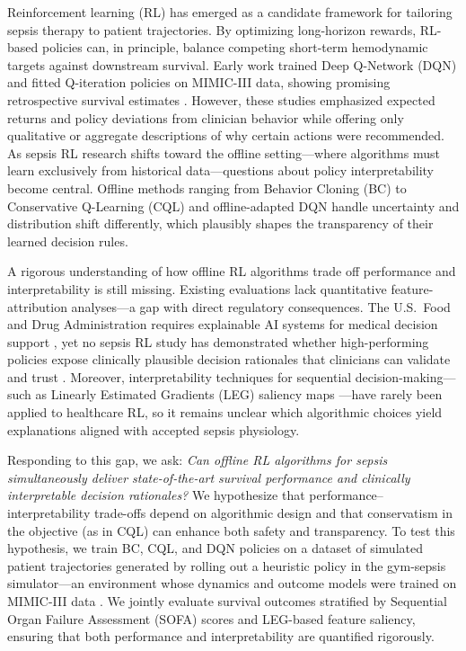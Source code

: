 Reinforcement learning (RL) has emerged as a candidate framework for tailoring sepsis therapy to patient trajectories. By optimizing long-horizon rewards, RL-based policies can, in principle, balance competing short-term hemodynamic targets against downstream survival. Early work trained Deep Q-Network (DQN) and fitted Q-iteration policies on MIMIC-III data, showing promising retrospective survival estimates \citep{raghu2017sepsis_drl, komorowski2018ai_clinician}. However, these studies emphasized expected returns and policy deviations from clinician behavior while offering only qualitative or aggregate descriptions of why certain actions were recommended. As sepsis RL research shifts toward the offline setting—where algorithms must learn exclusively from historical data—questions about policy interpretability become central. Offline methods ranging from Behavior Cloning (BC) to Conservative Q-Learning (CQL) and offline-adapted DQN handle uncertainty and distribution shift differently, which plausibly shapes the transparency of their learned decision rules.

A rigorous understanding of how offline RL algorithms trade off performance and interpretability is still missing. Existing evaluations lack quantitative feature-attribution analyses—a gap with direct regulatory consequences. The U.S.\ Food and Drug Administration requires explainable AI systems for medical decision support \citep{fda2021ai}, yet no sepsis RL study has demonstrated whether high-performing policies expose clinically plausible decision rationales that clinicians can validate and trust \citep{holzinger2017xai_healthcare}. Moreover, interpretability techniques for sequential decision-making—such as Linearly Estimated Gradients (LEG) saliency maps \citep{greydanus2018leg}—have rarely been applied to healthcare RL, so it remains unclear which algorithmic choices yield explanations aligned with accepted sepsis physiology.

Responding to this gap, we ask: \textit{Can offline RL algorithms for sepsis simultaneously deliver state-of-the-art survival performance and clinically interpretable decision rationales?} We hypothesize that performance--interpretability trade-offs depend on algorithmic design and that conservatism in the objective (as in CQL) can enhance both safety and transparency. To test this hypothesis, we train BC, CQL, and DQN policies on a dataset of simulated patient trajectories generated by rolling out a heuristic policy in the gym-sepsis simulator—an environment whose dynamics and outcome models were trained on MIMIC-III data \citep{raghu2017sepsis_drl}. We jointly evaluate survival outcomes stratified by Sequential Organ Failure Assessment (SOFA) scores and LEG-based feature saliency, ensuring that both performance and interpretability are quantified rigorously.

